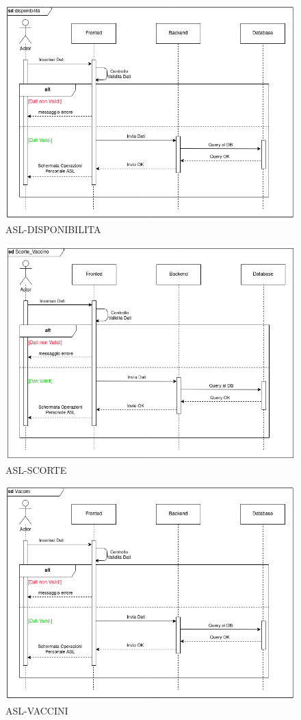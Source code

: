 \documentclass[a4paper,12pt,openany,oneside]{book}
\begin{document}
\begin{figure}[h] 
\centering
\includegraphics[width=0.8\columnwidth]{ASL-DISPONIBILITA.png} 
\caption{ASL-DISPONIBILITA} 
\end{figure}
\begin{figure}[h] 
\centering
\includegraphics[width=0.8\columnwidth]{ASL-SCORTE.png} 
\caption{ASL-SCORTE} 
\end{figure}
\begin{figure}[h] 
\centering
\includegraphics[width=0.8\columnwidth]{ASL-VACCINI.png} 
\caption{ASL-VACCINI} 
\end{figure}
\end{document}
